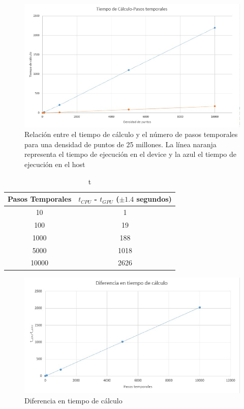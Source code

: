 \documentclass[11pt,a4paper,twoside,pdf]{article}
\numberwithin{equation}{section}
\begin{document}
\begin{figure}[h]
\centering
\includegraphics[width=15 cm]{T-Pasos_temporales.jpg}				
\caption{Relación entre el tiempo de cálculo y el número de pasos temporales para una densidad de puntos de 25 millones. La línea naranja representa el tiempo de ejecución en el device y la azul el tiempo de ejecución en el host}
\label{fig:t-pasos_temporales}
\end{figure}
\noindent




\begin{table}[h]
    \centering
    \begin{tabular}{|c|c|}
    \hline
         Pasos Temporales &  $t_{CPU}$ - $t_{GPU}$ ($\pm 1.4$ segundos)   \\ \hline \hline
         10 & 1  \\ \hline
          100 & 19  \\ \hline
          1000 & 188  \\ \hline
          5000 & 1018  \\ \hline
          10000 & 2626  \\ \hline
    \end{tabular}
    \caption{t}
    \label{tab:1}
\end{table}

\begin{figure}[h]
\centering
\includegraphics[width=15 cm]{DiferenciaEntiempoDeCalculo.jpg}				
\caption{Diferencia en tiempo de cálculo}
\label{fig:diferencia_en_tiempo_de_calculo}
\end{figure}
\noindent
\end{document}
